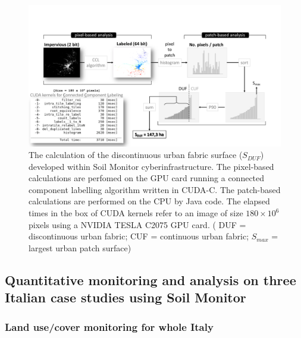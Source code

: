 \documentclass[APA,LATO1COL,doublespace]{WileyNJD-v2}
\begin{document}
\begin{figure}[t] %
    \centerline{\includegraphics[width=500pt]{daMileti/03_DUF_explanation.pdf}}
    \caption{ The calculation of the discontinuous urban fabric surface ($S_{DUF}$) developed within Soil Monitor cyberinfrastructure. 
    The pixel-based calculations are perfomed on the GPU card running a connected component labelling algorithm written in CUDA-C. 
    The patch-based calculations are performed on the CPU by Java code.
    The elapsed times in the box of CUDA kernels refer to an image of size $180 \times 10^6$ pixels using a NVIDIA TESLA C2075 GPU card.
    ( DUF = discontinuous urban fabric; CUF = continuous urban fabric; $S_{max}$ = largest urban patch surface)} \label{fig:ccl}
\end{figure}

\subsection{Quantitative monitoring and analysis on three Italian case studies using Soil Monitor}\label{sec:caseStudies}

\subsubsection{ Land use/cover monitoring for whole Italy } \label{sec:caseIT}
\end{document}
